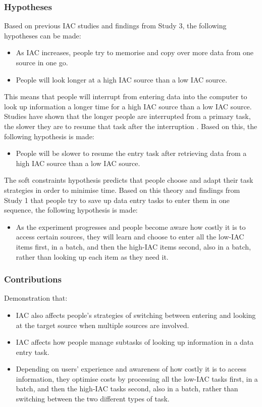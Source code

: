 \documentclass[11pt,oneside]{report}
\begin{document}
\begin{table}
\subsubsection{Hypotheses}
Based on previous IAC studies and findings from Study 3, the following hypotheses can be made: 
\begin{itemize}
\item
As IAC increases, people try to memorise and copy over more data from one source in one go. 
\item 
People will look longer at a high IAC source than a low IAC source.
\end{itemize}
This means that people will interrupt from entering data into the computer to look up information a longer time for a high IAC source than a low IAC source. Studies have shown that the longer people are interrupted from a primary task, the slower they are to resume that task after the interruption \citep[e.g.][]{Monk2008}. Based on this, the following hypothesis is made:
\begin{itemize}
\item 
People will be slower to resume the entry task after retrieving data from a high IAC source than a low IAC source.
\end{itemize}
The soft constraints hypothesis predicts that people choose and adapt their task strategies in order to minimise time. Based on this theory and findings from Study 1 that people try to save up data entry tasks to enter them in one sequence, the following hypothesis is made: 
\begin{itemize}
\item 
As the experiment progresses and people become aware how costly it is to access certain sources, they will learn and choose to enter all the low-IAC items first, in a batch, and then the high-IAC items second, also in a batch, rather than looking up each item as they need it. 
\end{itemize}

\subsubsection{Contributions}
Demonstration that:
\begin{itemize}

\item   
IAC also affects people's strategies of switching between entering and looking at the target source when multiple sources are involved.
\item
IAC affects how people manage subtasks of looking up information in a data entry task.
\item
Depending on users' experience and awareness of how costly it is to access information, they optimise costs by processing all the low-IAC tasks first, in a batch, and then the high-IAC tasks second, also in a batch, rather than switching between the two different types of task.  
\end{itemize}


\end{table}
\end{document}
